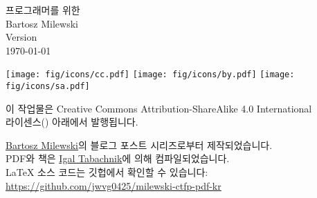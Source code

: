 \begin{small}
\begin{center}

\textsc{프로그래머를 위한 \trCategoryTheory}\\

\vspace{1.0em}
\noindent
Bartosz Milewski\\

\vspace{1.26em}
\noindent
Version \texttt{\OPTversion}\\\today


\vspace{1.6em}
\noindent
\texttt{[image: fig/icons/cc.pdf]}
\texttt{[image: fig/icons/by.pdf]}
\texttt{[image: fig/icons/sa.pdf]}

\vspace{0.4em}
\noindent
이 작업물은 Creative Commons Attribution-ShareAlike 4.0 International\\
라이센스(\href{http://creativecommons.org/licenses/by-sa/4.0/}{}) 아래에서 발행됩니다.

\vspace{1.26em}
\noindent
\href{https://bartoszmilewski.com/2014/10/28/category-theory-for-programmers-the-preface/}{Bartosz Milewski}의 블로그 포스트 시리즈로부터 제작되었습니다.\\
PDF와 책은 \href{https://hmemcpy.com}{Igal Tabachnik}에 의해 컴파일되었습니다.\\
\vspace{1.26em}
\noindent
\LaTeX{} 소스 코드는 깃헙에서 확인할 수 있습니다: \href{https://github.com/jwvg0425/milewski-ctfp-pdf-kr}{https://github.com/jwvg0425/milewski-ctfp-pdf-kr} 
\end{center}
\end{small}
